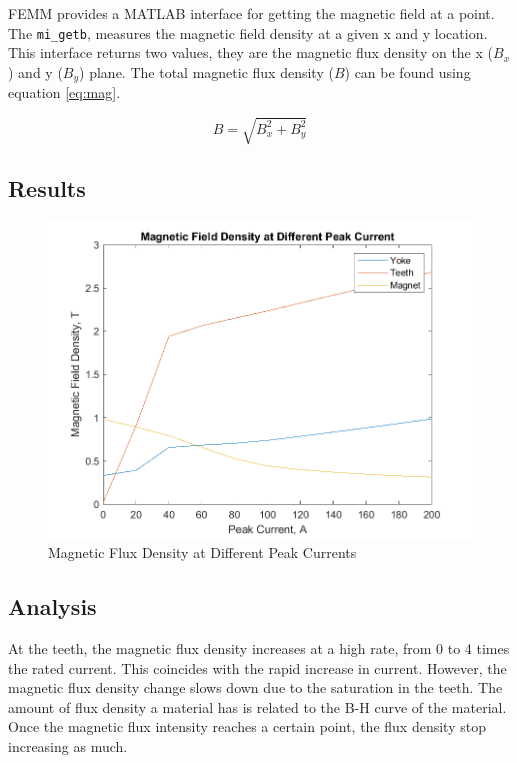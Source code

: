 \documentclass[12pt]{article}
\begin{document}
FEMM provides a MATLAB interface for getting the magnetic field at a point. The \lstinline{mi_getb}, measures the magnetic field density at a given x and y location. This interface returns two values, they are the magnetic flux density on the x ($B_{x}$) and y ($B_{y}$) plane. The total magnetic flux density ($B$) can be found using equation \ref{eq:mag}.

\begin{equation}\label{eq:mag}
    B = \sqrt{B_{x}^{2} + B_{y}^{2}}
\end{equation}

\subsection{Results}

\begin{figure}[h]
    \centering
    \includegraphics[width=1\linewidth]{img/task_4.png}
    \caption{Magnetic Flux Density at Different Peak Currents}
    \label{fig:task-4}
\end{figure}

\subsection{Analysis} \label{task-4-analysis}

At the teeth, the magnetic flux density increases at a high rate, from 0 to 4 times the rated current. This coincides with the rapid increase in current. However, the magnetic flux density change slows down due to the saturation in the teeth. The amount of flux density a material has is related to the B-H curve of the material. Once the magnetic flux intensity reaches a certain point, the flux density stop increasing as much.
\end{document}
